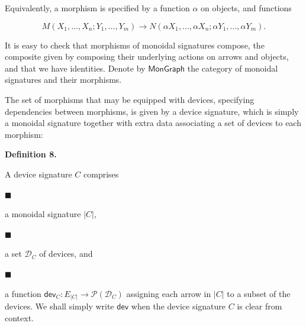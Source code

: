 \documentclass[10pt,a4paper]{article}
\begin{document}
Equivalently, a morphism is specified by a function $\alpha$ on objects, and functions\par
    \[M(X_{1},...,X_{n};Y_{1},...,Y_{m})\to N(\alpha X_{1},...,\alpha X_{n};\alpha Y_{1},...,\alpha Y_{m}).\]    
 
 
It is easy to check that morphisms of monoidal signatures compose, the composite given by composing their underlying actions on arrows and objects, and that we have identities. Denote by $\mathsf{MonGraph}$ the category of monoidal signatures and their morphisms.\par
 
 
 
 
The set of morphisms that may be equipped with devices, specifying dependencies between morphisms, is given by a device signature, which is simply a monoidal signature together with extra data associating a set of devices to each morphism:\par
 
 
 
\par\medskip\noindent\textbf{Definition 8.}\par
 
 
A device signature $C$ comprises\par
  
\par\noindent  $\blacksquare$ 
 
a monoidal signature $|C|$,\par
 
 
 
\par\noindent  $\blacksquare$ 
 
a set $\mathcal{D}_{C}$ of devices, and\par
 
 
 
\par\noindent  $\blacksquare$ 
 
a function $\mathsf{dev}_{C}:E_{|C|}\to\mathcal{P}(\mathcal{D}_{C})$ assigning each arrow in $|C|$ to a subset of the devices. We shall simply write $\mathsf{dev}$ when the device signature $C$ is clear from context.\par
 
\end{document}
